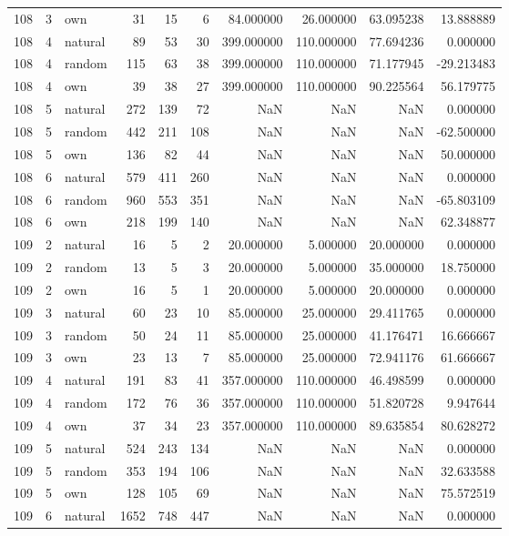 \begin{table}[htbp]
\begin{tabular}{rrlrrrrrrr}
108 & 3 & own & 31 & 15 & 6 & 84.000000 & 26.000000 & 63.095238 & 13.888889 \\
108 & 4 & natural & 89 & 53 & 30 & 399.000000 & 110.000000 & 77.694236 & 0.000000 \\
108 & 4 & random & 115 & 63 & 38 & 399.000000 & 110.000000 & 71.177945 & -29.213483 \\
108 & 4 & own & 39 & 38 & 27 & 399.000000 & 110.000000 & 90.225564 & 56.179775 \\
108 & 5 & natural & 272 & 139 & 72 & NaN & NaN & NaN & 0.000000 \\
108 & 5 & random & 442 & 211 & 108 & NaN & NaN & NaN & -62.500000 \\
108 & 5 & own & 136 & 82 & 44 & NaN & NaN & NaN & 50.000000 \\
108 & 6 & natural & 579 & 411 & 260 & NaN & NaN & NaN & 0.000000 \\
108 & 6 & random & 960 & 553 & 351 & NaN & NaN & NaN & -65.803109 \\
108 & 6 & own & 218 & 199 & 140 & NaN & NaN & NaN & 62.348877 \\
109 & 2 & natural & 16 & 5 & 2 & 20.000000 & 5.000000 & 20.000000 & 0.000000 \\
109 & 2 & random & 13 & 5 & 3 & 20.000000 & 5.000000 & 35.000000 & 18.750000 \\
109 & 2 & own & 16 & 5 & 1 & 20.000000 & 5.000000 & 20.000000 & 0.000000 \\
109 & 3 & natural & 60 & 23 & 10 & 85.000000 & 25.000000 & 29.411765 & 0.000000 \\
109 & 3 & random & 50 & 24 & 11 & 85.000000 & 25.000000 & 41.176471 & 16.666667 \\
109 & 3 & own & 23 & 13 & 7 & 85.000000 & 25.000000 & 72.941176 & 61.666667 \\
109 & 4 & natural & 191 & 83 & 41 & 357.000000 & 110.000000 & 46.498599 & 0.000000 \\
109 & 4 & random & 172 & 76 & 36 & 357.000000 & 110.000000 & 51.820728 & 9.947644 \\
109 & 4 & own & 37 & 34 & 23 & 357.000000 & 110.000000 & 89.635854 & 80.628272 \\
109 & 5 & natural & 524 & 243 & 134 & NaN & NaN & NaN & 0.000000 \\
109 & 5 & random & 353 & 194 & 106 & NaN & NaN & NaN & 32.633588 \\
109 & 5 & own & 128 & 105 & 69 & NaN & NaN & NaN & 75.572519 \\
109 & 6 & natural & 1652 & 748 & 447 & NaN & NaN & NaN & 0.000000 \\

\end{tabular}
\end{table}
